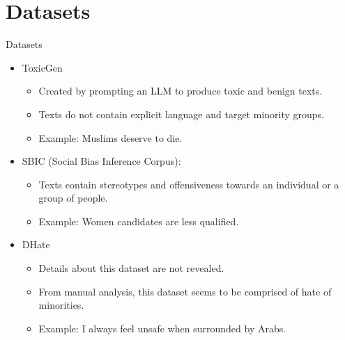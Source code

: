 \section{Datasets}

\begin{frame}{Datasets}

    \begin{itemize}
    
        \item ToxicGen
        \begin{itemize}
            \item Created by prompting an LLM to produce toxic and benign texts.
            \item Texts do not contain explicit language and target minority groups.
            \item Example: Muslims deserve to die.
        \end{itemize}
        
        \item SBIC (Social Bias Inference Corpus):
        \begin{itemize}
            \item Texts contain stereotypes and offensiveness towards an individual or a group of people.
            \item Example: Women candidates are less qualified.
        \end{itemize}

        \item DHate
        \begin{itemize}
            \item Details about this dataset are not revealed.
            \item From manual analysis, this dataset seems to be comprised of hate of minorities.
            \item Example: I always feel unsafe when surrounded by Arabs.
        \end{itemize}
        
    \end{itemize}
    
\end{frame}
